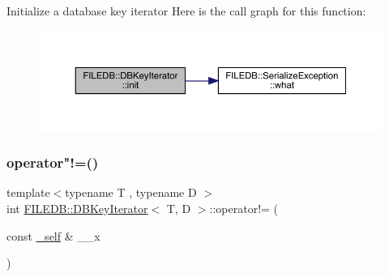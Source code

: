 Initialize a database key iterator Here is the call graph for this function\+:
\nopagebreak
\begin{figure}[H]
\begin{center}
\leavevmode
\includegraphics[width=350pt]{d4/d89/classFILEDB_1_1DBKeyIterator_af4a5e1eaeb6e5c491c5894f3e70f893c_cgraph}
\end{center}
\end{figure}
\mbox{\label{classFILEDB_1_1DBKeyIterator_aa92d51bde395e8c546d9cbe1c65ef5e1}} 
\subsubsection{\texorpdfstring{operator"!=()}{operator!=()}\hspace{0.1cm}{\footnotesize\ttfamily [1/3]}}
{\footnotesize\ttfamily template$<$typename T , typename D $>$ \\
int \mbox{\hyperlink{classFILEDB_1_1DBKeyIterator}{F\+I\+L\+E\+D\+B\+::\+D\+B\+Key\+Iterator}}$<$ T, D $>$\+::operator!= (\begin{DoxyParamCaption}\item[{const \mbox{\hyperlink{classFILEDB_1_1DBKeyIterator_aaf7773c7a848ec6e04bc738dd794ace1}{\+\_\+self}} \&}]{\+\_\+\+\_\+x }\end{DoxyParamCaption})\hspace{0.3cm}{\ttfamily [inline]}}

\mbox{\label{classFILEDB_1_1DBKeyIterator_aa92d51bde395e8c546d9cbe1c65ef5e1}} 
